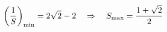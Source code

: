\documentclass[preview]{standalone}
\begin{document}
\begin{align*}
\special{dvisvgm:raw <g id='unique000'>}\left(\frac{1}{S}\right)_{\min}=2\sqrt2-2\quad\Rightarrow\quad S_{\max}=\frac{1+\sqrt2}{2}\special{dvisvgm:raw </g>}
\end{align*}
\end{document}
